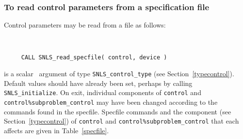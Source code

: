\documentclass{galahad}
\newcommand{\packagename}{SNLS}
\begin{document}
\subsubsection{To read control parameters from a specification file}
\label{readspec}

Control parameters may be read from a file as follows:
\hskip0.5in
\def\baselinestretch{0.8} {\tt
\begin{verbatim}
     CALL SNLS_read_specfile( control, device )
\end{verbatim}
}
\def\baselinestretch{1.0}

\begin{description}
 is a scalar \intentinout\ argument of type
{\tt \packagename\_control\_type}
(see Section~\ref{typecontrol}).
Default values should have already been set, perhaps by calling
{\tt \packagename\_initialize}.
On exit, individual components of {\tt control} and
{\tt control\%subproblem\_control}
may have been changed
according to the commands found in the specfile. Specfile commands and
the component (see Section~\ref{typecontrol}) of {\tt control}
and {\tt control\%subproblem\_control}
that each affects are given in Table~\ref{specfile}.


\end{description}
\end{document}
